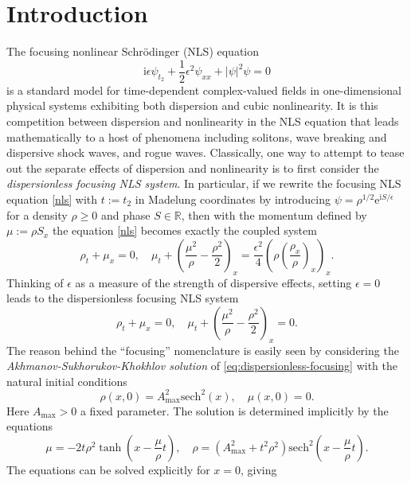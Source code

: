 \documentclass[12pt]{amsart}
\numberwithin{equation}{section}
\newcommand{\ee}{\mathrm{e}}
\newcommand{\ii}{\mathrm{i}}
\def\eq{\begin{equation}}
\def\endeq{\end{equation}}
\begin{document}
\section{Introduction}
\label{sec-intro}
\label{sec:ASK}
The focusing nonlinear Schr\"odinger (NLS) equation 
\eq
\label{nls}
\ii\epsilon \psi_{t_2} + \frac{1}{2}\epsilon^2\psi_{xx} + |\psi|^2\psi = 0
\endeq
is a standard model for time-dependent complex-valued fields in one-dimensional physical 
systems exhibiting both dispersion and cubic nonlinearity.  It is this 
competition between dispersion and nonlinearity in the NLS equation that leads 
mathematically to a host of phenomena including solitons, wave breaking and 
dispersive shock waves, and rogue waves.  Classically, one way to attempt to 
tease out the separate effects of dispersion and nonlinearity is to first 
consider the \emph{dispersionless focusing NLS system}.  
In particular, if we rewrite the focusing NLS equation \eqref{nls} with 
$t:=t_2$ in Madelung coordinates by introducing 
$\psi=\rho^{1/2}\ee^{\ii S/\epsilon}$ for a density $\rho\ge 0$ and phase 
$S\in\mathbb{R}$, then with the momentum defined by $\mu:=\rho S_x$ the 
equation \eqref{nls} becomes exactly the coupled system
\eq
\rho_t + \mu_x=0,\quad \mu_t + \left(\frac{\mu^2}{\rho}-\frac{\rho^2}{2}\right)_x= \frac{\epsilon^2}{4}\left(\rho\left(\frac{\rho_x}{\rho}\right)_x\right)_x.
\endeq
Thinking of $\epsilon$ as a measure of the strength of dispersive effects, 
setting $\epsilon=0$ leads to the dispersionless focusing NLS system 
\begin{equation}
\rho_t + \mu_x=0,\quad \mu_t + \left(\frac{\mu^2}{\rho}-\frac{\rho^2}{2}\right)_x= 0.
\label{eq:dispersionless-focusing}
\end{equation}
The reason behind the ``focusing'' nomenclature is easily seen by considering 
the \emph{Akhmanov-Sukhorukov-Khokhlov solution} \cite{AkhmanovSK66} 
of \eqref{eq:dispersionless-focusing} with the natural initial conditions 
\begin{equation}
\rho(x,0)=A_\mathrm{max}^2\mathrm{sech}^2(x), \quad \mu(x,0)=0.
\end{equation}
Here $A_\mathrm{max}>0$ a fixed parameter.  The solution is determined 
implicitly by the equations
\begin{equation}
\mu=-2t\rho^2\tanh\left(x-\frac{\mu}{\rho}t\right),\quad \rho=(A_\mathrm{max}^2+t^2\rho^2)\mathrm{sech}^2\left(x-\frac{\mu}{\rho}t\right).
\label{eq:ASK-implicit}
\end{equation}
The equations can be solved explicitly for $x=0$, giving 
\end{document}
